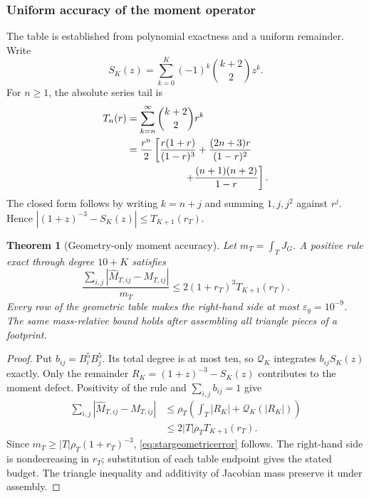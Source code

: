 \documentclass[journal]{IEEEtran}
\newtheorem{theorem}{Theorem}
\begin{document}
\subsubsection{Uniform accuracy of the moment operator}
The table is established from polynomial exactness and a uniform remainder.
Write
\begin{equation}
 S_K(z)=\sum_{k=0}^K(-1)^k\binom{k+2}{2}z^k.
\end{equation}
For $n\geq1$, the absolute series tail is
\begin{align}
 T_n(r)&=\sum_{k=n}^\infty\binom{k+2}{2}r^k\nonumber\\
 &=\frac{r^n}{2}\left[
 \frac{r(1+r)}{(1-r)^3}+\frac{(2n+3)r}{(1-r)^2}\right.\nonumber\\
 &\hspace{20mm}\left.+\frac{(n+1)(n+2)}{1-r}\right].
 \label{eq:starwarptail}
\end{align}
The closed form follows by writing $k=n+j$ and summing $1,j,j^2$ against
$r^j$. Hence $|(1+z)^{-3}-S_K(z)|\leq T_{K+1}(r_T)$.

\begin{theorem}[Geometry-only moment accuracy]
Let $m_T=\int_TJ_G$. A positive rule exact through degree $10+K$ satisfies
\begin{equation}
 \frac{\sum_{i,j}|\widehat M_{T,ij}-M_{T,ij}|}{m_T}
 \leq 2(1+r_T)^3T_{K+1}(r_T).
 \label{eq:stargeometricerror}
\end{equation}
Every row of the geometric table makes the right-hand side at most
$\varepsilon_g=10^{-9}$. The same mass-relative bound holds after assembling
all triangle pieces of a footprint.
\end{theorem}
\begin{proof}
Put $b_{ij}=B_i^5B_j^5$. Its total degree is at most ten, so
$\mathcal Q_K$ integrates $b_{ij}S_K(z)$ exactly. Only the remainder
$R_K=(1+z)^{-3}-S_K(z)$ contributes to the moment defect. Positivity of the
rule and $\sum_{i,j}b_{ij}=1$ give
\begin{align}
 \sum_{i,j}|\widehat M_{T,ij}-M_{T,ij}|
 &\leq\rho_T\left(\int_T|R_K|+
 \mathcal Q_K(|R_K|)\right)\nonumber\\
 &\leq2|T|\rho_TT_{K+1}(r_T).
\end{align}
Since $m_T\geq|T|\rho_T(1+r_T)^{-3}$,
\eqref{eq:stargeometricerror} follows. The right-hand side is nondecreasing
in $r_T$; substitution of each table endpoint gives the stated budget.
The triangle inequality and additivity of Jacobian mass preserve it under
assembly.
\end{proof}
\end{document}
